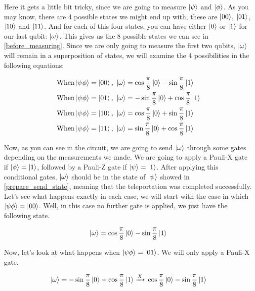 \documentclass[]{article}
\newcommand\Xto{\xrightarrow{X}}
\begin{document}
Here it gets a little bit tricky, since we are going to measure $\ket{\psi}$ and $\ket{\phi}$. As you may know, there are 4 possible states we might end up with, these are $\ket{00}$, $\ket{01}$, $\ket{10}$ and $\ket{11}$. And for each of this four states, you can have either $\ket{0}$ or $\ket{1}$ for our last qubit: $\ket{\omega}$. This gives us the 8 possible states we can see in \eqref{before_measuring}. Since we are only going to measure the first two qubits, $\ket{\omega}$ will remain in a superposition of states, we will examine the 4 possibilities in the following equations:

\begin{align}
    \textrm{When} \ket{\psi\phi}=\ket{00} \textrm{, } \ket{\omega}&=\cos{\frac{\pi}{8}}\ket{0} - \sin{\frac{\pi}{8}}\ket{1} \\
    \textrm{When} \ket{\psi\phi}=\ket{01} \textrm{, } \ket{\omega}&=-\sin{\frac{\pi}{8}}\ket{0} + \cos{\frac{\pi}{8}}\ket{1} \\
    \textrm{When} \ket{\psi\phi}=\ket{10} \textrm{, } \ket{\omega}&=\cos{\frac{\pi}{8}}\ket{0} + \sin{\frac{\pi}{8}}\ket{1} \\
    \textrm{When} \ket{\psi\phi}=\ket{11} \textrm{, } \ket{\omega}&=\sin{\frac{\pi}{8}}\ket{0} + \cos{\frac{\pi}{8}}\ket{1}
\end{align}

Now, as you can see in the circuit, we are going to send $\ket{\omega}$ through some gates depending on the measurements we made. We are going to apply a Pauli-X gate if $\ket{\phi} = \ket{1}$, followed by a Pauli-Z gate if $\ket{\psi}=\ket{1}$. After applying this conditional gates, $\ket{\omega}$ should be in the state of $\ket{\psi}$ showed in \eqref{prepare_send_state}, meaning that the teleportation was completed successfully. Let's see what happens exactly in each case, we will start with the case in which $\ket{\psi\phi}=\ket{00}$. Well, in this case no further gate is applied, we just have the following state.

\begin{equation} \label{first_case}
    \ket{\omega} = \cos{\frac{\pi}{8}}\ket{0} - \sin{\frac{\pi}{8}}\ket{1}
\end{equation}

Now, let's look at what happens when $\ket{\psi\phi}=\ket{01}$. We will only apply a Pauli-X gate. 

\begin{align} \label{second_case}
    \ket{\omega}=-\sin{\frac{\pi}{8}}\ket{0} + \cos{\frac{\pi}{8}}\ket{1} \Xto{} \cos{\frac{\pi}{8}}\ket{0} - \sin{\frac{\pi}{8}}\ket{1}
\end{align}
\end{document}
